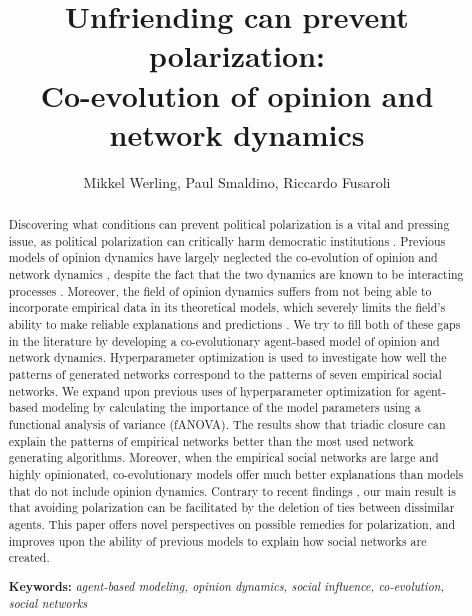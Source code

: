\documentclass[11pt]{article}
\title{Unfriending can prevent polarization: 
\Large \\Co-evolution of opinion and network dynamics}
\author{Mikkel Werling, Paul Smaldino, Riccardo Fusaroli}
\date{}
\begin{document}
\maketitle
\thispagestyle{empty}

\begin{abstract}
  \noindent Discovering what conditions can prevent political polarization is a vital and pressing issue, as political polarization can critically harm democratic institutions \cite{boxell_cross-country_2020, levin_dynamics_2021}. Previous models of opinion dynamics have largely neglected the co-evolution of opinion and network dynamics \cite{flache_models_2017, galesic_integrating_2021}, despite the fact that the two dynamics are known to be interacting processes \cite{bener_empirical_2016, mcpherson_birds_2001, kossinets_origins_2009}.
  Moreover, the field of opinion dynamics suffers from not being able to incorporate empirical data in its theoretical models, which severely limits the field's ability to make reliable explanations and predictions \cite{flache_models_2017,galesic_integrating_2021, mas2019challenges}.
  We try to fill both of these gaps in the literature by developing a co-evolutionary agent-based model of opinion and network dynamics. Hyperparameter optimization is used to investigate how well the patterns of generated networks correspond to the patterns of seven empirical social networks. We expand upon previous uses of hyperparameter optimization for agent-based modeling by calculating the importance of the model parameters using a functional analysis of variance (fANOVA).
  The results show that triadic closure can explain the patterns of empirical networks better than the most used network generating algorithms. Moreover, when the empirical social networks are large and highly opinionated, co-evolutionary models offer much better explanations than models that do not include opinion dynamics.
  Contrary to recent findings \cite{sasahara_social_2021}, our main result is that avoiding polarization can be facilitated by the deletion of ties between dissimilar agents. This paper offers novel perspectives on possible remedies for polarization, and improves upon the ability of previous models to explain how social networks are created. 
  
  \centering
  \vspace{3mm}
  \noindent \textbf{Keywords:} \textit{agent-based modeling, opinion dynamics, social influence, co-evolution, social networks}
\end{abstract}
\end{document}
